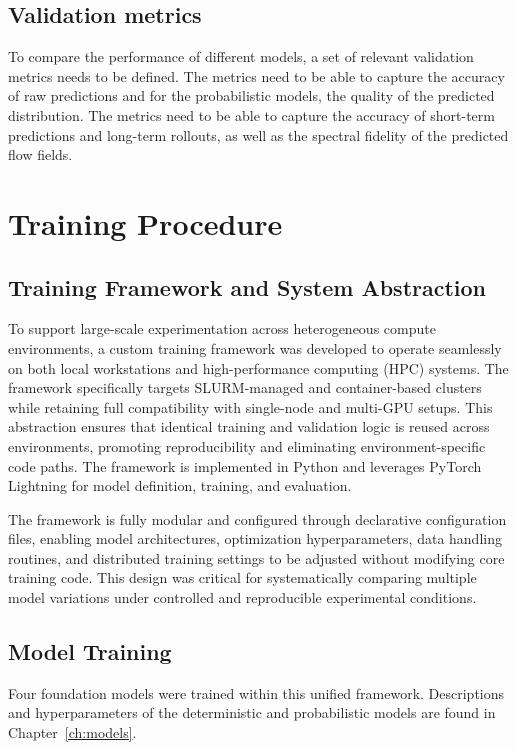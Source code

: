 \subsection{Validation metrics}

To compare the performance of different models, a set of relevant validation metrics needs to be defined. The metrics need to be able to capture the accuracy of raw predictions and for the probabilistic models, the quality of the predicted distribution. The metrics need to be able to capture the accuracy of short-term predictions and long-term rollouts, as well as the spectral fidelity of the predicted flow fields. 

\section{Training Procedure}

\subsection{Training Framework and System Abstraction}

To support large-scale experimentation across heterogeneous compute environments, a custom training framework was developed to operate seamlessly on both local workstations and high-performance computing (HPC) systems. The framework specifically targets SLURM-managed and container-based clusters while retaining full compatibility with single-node and multi-GPU setups. This abstraction ensures that identical training and validation logic is reused across environments, promoting reproducibility and eliminating environment-specific code paths. The framework is implemented in Python and leverages PyTorch Lightning for model definition, training, and evaluation.

The framework is fully modular and configured through declarative configuration files, enabling model architectures, optimization hyperparameters, data handling routines, and distributed training settings to be adjusted without modifying core training code. This design was critical for systematically comparing multiple model variations under controlled and reproducible experimental conditions.

\subsection{Model Training}

Four foundation models were trained within this unified framework. Descriptions and hyperparameters of the deterministic and probabilistic models are found in Chapter~\ref{ch:models}.

